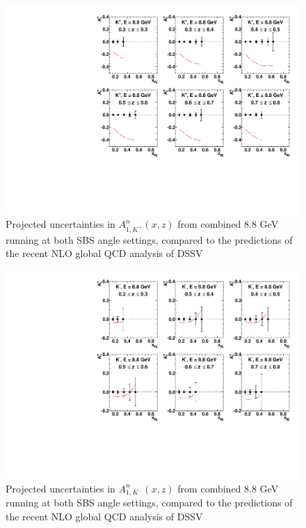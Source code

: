 \begin{figure}[h]
  \begin{center}
    \includegraphics[width=.75\textwidth]{figures/A1n_vs_x_E88_kp.pdf}
  \end{center}
  \caption{\label{A1n_kp_88gev} Projected uncertainties in $A_{1,K^+}^{n}(x,z)$ from combined 8.8 GeV running at both SBS angle settings, compared to the predictions of the recent NLO global QCD analysis of DSSV~\cite{DSSVplus}}
\end{figure}
\begin{figure}[h]
  \begin{center}
    \includegraphics[width=.75\textwidth]{figures/A1n_vs_x_E88_km.pdf}
  \end{center}
  \caption{\label{A1n_km_88gev} Projected uncertainties in $A_{1,K^-}^{n}(x,z)$ from combined 8.8 GeV running at both SBS angle settings, compared to the predictions of the recent NLO global QCD analysis of DSSV~\cite{DSSVplus}}
\end{figure}
